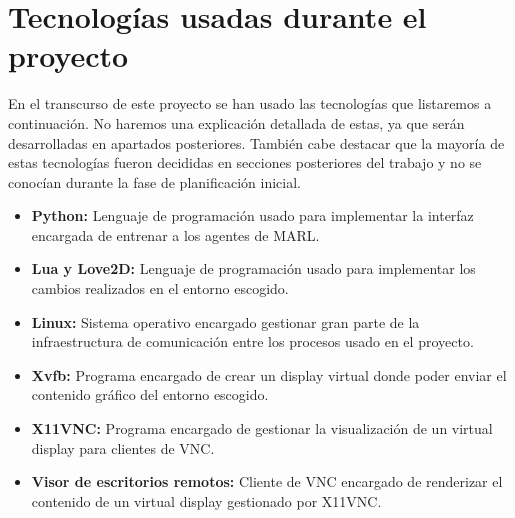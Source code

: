 \section{Tecnologías usadas durante el proyecto}

En el transcurso de este proyecto se han usado las tecnologías que listaremos a continuación. No haremos una explicación detallada de estas, ya que serán desarrolladas en apartados posteriores. También cabe destacar que la mayoría de estas tecnologías fueron decididas en secciones posteriores del trabajo y no se conocían durante la fase de planificación inicial.

\begin{itemize}
    \item \textbf{Python:} Lenguaje de programación usado para implementar la interfaz encargada de entrenar a los agentes de MARL.
    \item \textbf{Lua y Love2D:} Lenguaje de programación usado para implementar los cambios realizados en el entorno escogido.
    \item \textbf{Linux:} Sistema operativo encargado gestionar gran parte de la infraestructura de comunicación entre los procesos usado en el proyecto.
    \item \textbf{Xvfb:} Programa encargado de crear un display virtual donde poder enviar el contenido gráfico del entorno escogido.
    \item \textbf{X11VNC:} Programa encargado de gestionar la visualización de un virtual display para clientes de VNC.
    \item \textbf{Visor de escritorios remotos:} Cliente de VNC encargado de renderizar el contenido de un virtual display gestionado por X11VNC.
\end{itemize}

